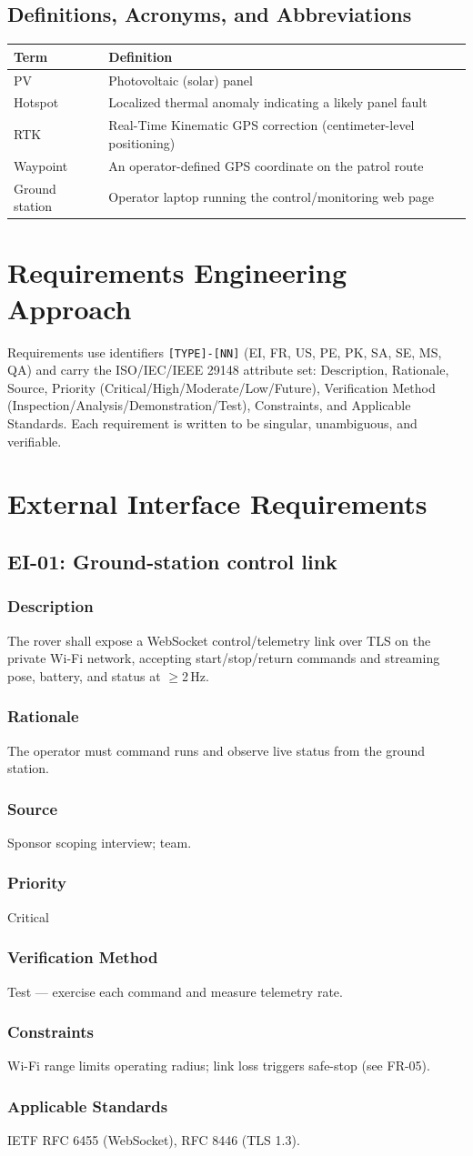 \documentclass[11pt,letterpaper]{article}
\newcommand{\req}[7]{%
  \subsubsection*{Description} #1
  \subsubsection*{Rationale} #2
  \subsubsection*{Source} #3
  \subsubsection*{Priority} #4
  \subsubsection*{Verification Method} #5
  \subsubsection*{Constraints} #6
  \subsubsection*{Applicable Standards} #7
}
\begin{document}
\subsection{Definitions, Acronyms, and Abbreviations}
\begin{table}[H]\begin{center}
\begin{tabular}{ | p{3cm} | p{10cm} |}\hline
\textbf{Term} & \textbf{Definition} \\ \hline
PV & Photovoltaic (solar) panel \\ \hline
Hotspot & Localized thermal anomaly indicating a likely panel fault \\ \hline
RTK & Real-Time Kinematic GPS correction (centimeter-level positioning) \\ \hline
Waypoint & An operator-defined GPS coordinate on the patrol route \\ \hline
Ground station & Operator laptop running the control/monitoring web page \\ \hline
\end{tabular}\end{center}\end{table}
\newpage

\section{Requirements Engineering Approach}
Requirements use identifiers \texttt{[TYPE]-[NN]} (EI, FR, US, PE, PK, SA, SE, MS,
QA) and carry the ISO/IEC/IEEE 29148 attribute set: Description, Rationale, Source,
Priority (Critical/High/Moderate/Low/Future), Verification Method
(Inspection/Analysis/Demonstration/Test), Constraints, and Applicable Standards.
Each requirement is written to be singular, unambiguous, and verifiable.
\newpage

\section{External Interface Requirements}
\subsection{EI-01: Ground-station control link}
\req{The rover shall expose a WebSocket control/telemetry link over TLS on the
private Wi-Fi network, accepting start/stop/return commands and streaming pose,
battery, and status at $\geq$2\,Hz.}
{The operator must command runs and observe live status from the ground station.}
{Sponsor scoping interview; team.}
{Critical}
{Test --- exercise each command and measure telemetry rate.}
{Wi-Fi range limits operating radius; link loss triggers safe-stop (see FR-05).}
{IETF RFC 6455 (WebSocket), RFC 8446 (TLS 1.3).}
\end{document}
